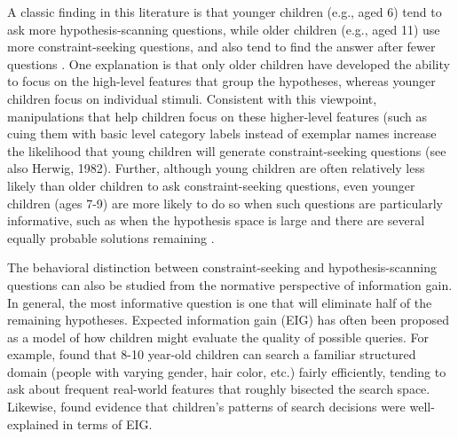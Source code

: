 \documentclass[man,floatsintext]{apa6}
\begin{document}
A classic finding in this literature is that younger children (e.g., aged 6) tend to ask more hypothesis-scanning questions, while older children (e.g., aged 11) use more constraint-seeking  questions, and also 
tend to find the answer after fewer questions \cite{Mosher:1966}. 
One explanation is that only older children have developed the ability to focus on the 
high-level features that group the hypotheses, whereas younger children focus on individual stimuli.
Consistent with this viewpoint, manipulations that help children focus on these higher-level features (such as cuing them with basic level category labels instead of exemplar names 
\cite{Ruggeri:2015front} increase the likelihood that young children will generate constraint-seeking questions (see also Herwig, 1982).
Further, although young children are often relatively less likely than older children to ask constraint-seeking questions, even younger children (ages 7-9) are 
more likely to do so when such questions are particularly informative, such as when the hypothesis space is large and there are several equally probable solutions remaining \cite{Ruggeri:2014,Ruggeri:2015}.
\nocite{Herwig:1982}



The behavioral distinction between constraint-seeking and hypothesis-scanning questions can also be studied from the normative perspective of information gain. In general, the most informative question is one that will eliminate half of the remaining hypotheses. 
 Expected information gain (EIG) has often been proposed as a model of how children might evaluate the quality of possible queries.  For example,  found that 8-10 year-old children can search a familiar structured domain (people with varying gender, hair color, etc.) fairly efficiently, tending to ask about frequent real-world features that roughly bisected the search space. 
 Likewise,  found evidence that children's patterns of search decisions were well-explained in terms of EIG.
\end{document}

